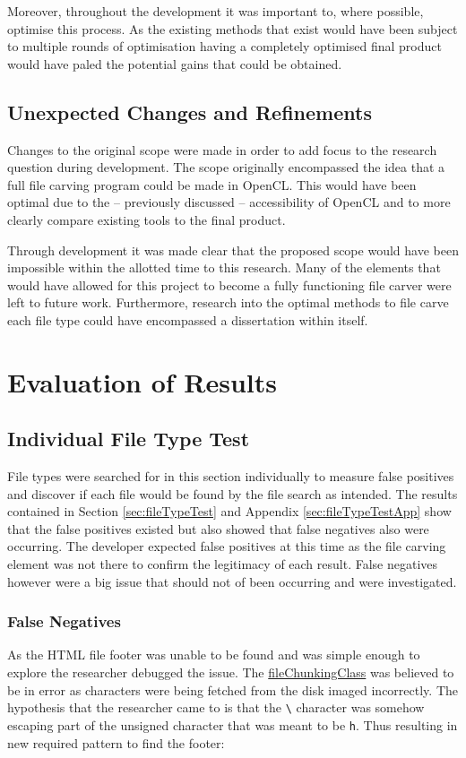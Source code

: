 Moreover, throughout the development it was important to, where possible, optimise this process.
As the existing methods that exist would have been subject to multiple rounds of optimisation having a completely optimised final product would have paled the potential gains that could be obtained.
\newpage
\subsection{Unexpected Changes and Refinements}
Changes to the original scope were made in order to add focus to the research question during development.
The scope originally encompassed the idea that a full file carving program could be made in OpenCL.
This would have been optimal due to the -- previously discussed -- accessibility of OpenCL and to more clearly compare existing tools to the final product.

Through development it was made clear that the proposed scope would have been impossible within the allotted time to this research.
Many of the elements that would have allowed for this project to become a fully functioning file carver were left to future work.
Furthermore, research into the optimal methods to file carve each file type could have encompassed a dissertation within itself.

\section{Evaluation of Results}
\subsection{Individual File Type Test}
File types were searched for in this section individually to measure false positives and discover if each file would be found by the file search as intended.
The results contained in Section \ref{sec:fileTypeTest} and Appendix \ref{sec:fileTypeTestApp} show that the false positives existed but also showed that false negatives also were occurring.
The developer expected false positives at this time as the file carving element was not there to confirm the legitimacy of each result.
False negatives however were a big issue that should not of been occurring and were investigated.\\

\subsubsection*{False Negatives}
\label{subsec:fileTypeDiscussion}
As the HTML file footer was unable to be found and was simple enough to explore the researcher debugged the issue.
The \href{https://github.com/yeroc-sebrof/fileChunkingClass}{fileChunkingClass} was believed to be in error as characters were being fetched from the disk imaged incorrectly.
The hypothesis that the researcher came to is that the \texttt{\textbackslash} character was somehow escaping part of the unsigned character that was meant to be \texttt{h}.
Thus resulting in new required pattern to find the footer:

